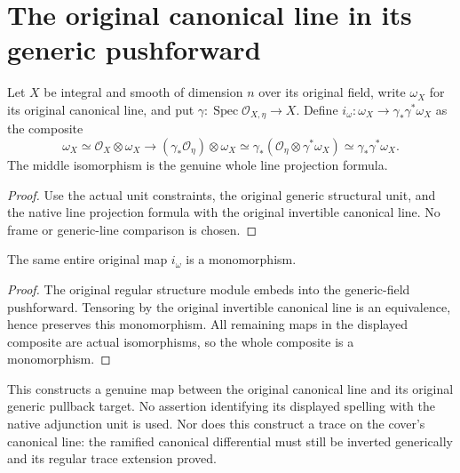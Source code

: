 \section{The original canonical line in its generic pushforward}

\begin{definition}
\label{def:kn-canonical-actual-generic-inclusion}
\leanok
Let $X$ be integral and smooth of dimension $n$ over its original field,
write $\omega_X$ for its original canonical line, and put
$\gamma:\operatorname{Spec}\mathcal O_{X,\eta}\to X$.
Define $i_\omega:\omega_X\to\gamma_*\gamma^*\omega_X$ as the composite
\[
 \omega_X\simeq\mathcal O_X\otimes\omega_X
 \longrightarrow(\gamma_*\mathcal O_\eta)\otimes\omega_X
 \simeq\gamma_*(\mathcal O_\eta\otimes\gamma^*\omega_X)
 \simeq\gamma_*\gamma^*\omega_X.
\]
The middle isomorphism is the genuine whole line projection formula.
\end{definition}
\begin{proof}
Use the actual unit constraints, the original generic structural unit,
and the native line projection formula with the original invertible
canonical line. No frame or generic-line comparison is chosen.
\end{proof}

\begin{lemma}
\label{lem:kn-canonical-actual-generic-inclusion-mono}
\leanok
The same entire original map $i_\omega$ is a monomorphism.
\end{lemma}
\begin{proof}
The original regular structure module embeds into the generic-field
pushforward. Tensoring by the original invertible canonical line is
an equivalence, hence preserves this monomorphism. All remaining maps
in the displayed composite are actual isomorphisms, so the whole
composite is a monomorphism.
\end{proof}

This constructs a genuine map between the original canonical line and
its original generic pullback target. No assertion identifying its
displayed spelling with the native adjunction unit is used. Nor does
this construct a trace on the cover's canonical line: the ramified
canonical differential must still be inverted generically and its
regular trace extension proved.
